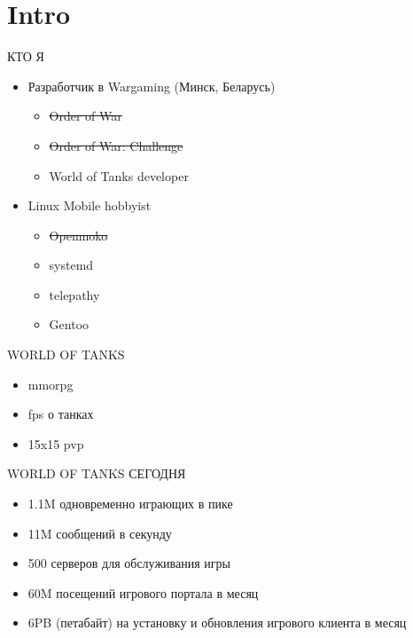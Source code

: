 \documentclass[aspectratio=169]{beamer}
\begin{document}
\section{Intro}
\begin{frame}{КТО Я}
    \begin{itemize}
        \item Разработчик в Wargaming (Минск, Беларусь)
            \begin{itemize}
                \item \sout{Order of War}
                \item \sout{Order of War: Challenge}
                \item World of Tanks developer
            \end{itemize}
        \item Linux Mobile hobbyist
            \begin{itemize}
                \item \sout{Openmoko}
                \item systemd
                \item telepathy
                \item Gentoo
            \end{itemize}
    \end{itemize}
\end{frame}

\begin{frame}{WORLD OF TANKS}
    \begin{itemize}
        \item mmorpg
        \item fps о танках
        \item 15x15 pvp
    \end{itemize}
\end{frame}

\begin{frame}{WORLD OF TANKS СЕГОДНЯ}
    \begin{itemize}
        \item 1.1M одновременно играющих в пике
        \item 11M сообщений в секунду
        \item 500 серверов для обслуживания игры
        \item 60M посещений игрового портала в месяц
        \item 6PB (петабайт) на установку и обновления игрового клиента в месяц
    \end{itemize}
\end{frame}
\end{document}
